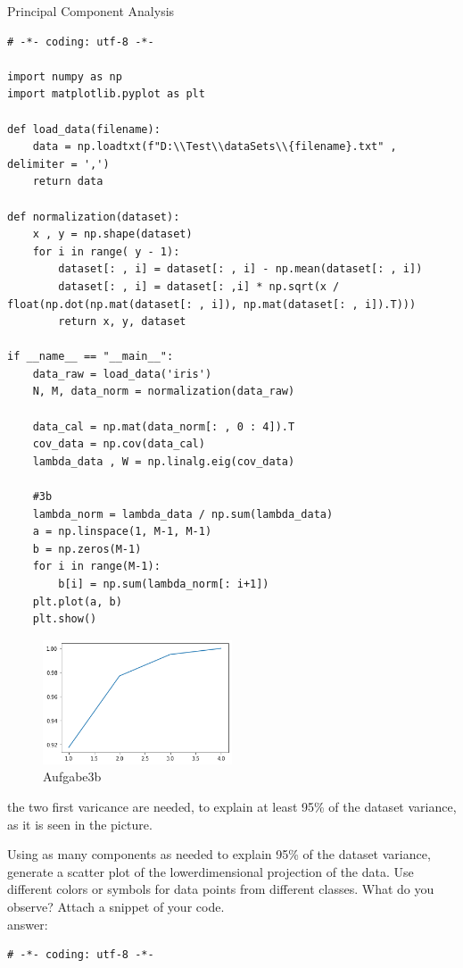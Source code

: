 \documentclass[
	ngerman,
     solution=true
	]{tudaexercise}
\begin{document}
\begin{task}{Principal Component Analysis}
\begin{subtask}[3b)]
\begin{lstlisting}
# -*- coding: utf-8 -*-

import numpy as np
import matplotlib.pyplot as plt

def load_data(filename):
    data = np.loadtxt(f"D:\\Test\\dataSets\\{filename}.txt" , delimiter = ',')
    return data

def normalization(dataset):
    x , y = np.shape(dataset)
    for i in range( y - 1):
        dataset[: , i] = dataset[: , i] - np.mean(dataset[: , i])
        dataset[: , i] = dataset[: ,i] * np.sqrt(x / float(np.dot(np.mat(dataset[: , i]), np.mat(dataset[: , i]).T)))
        return x, y, dataset
    
if __name__ == "__main__":
    data_raw = load_data('iris')
    N, M, data_norm = normalization(data_raw)
    
    data_cal = np.mat(data_norm[: , 0 : 4]).T
    cov_data = np.cov(data_cal)
    lambda_data , W = np.linalg.eig(cov_data)
    
    #3b
    lambda_norm = lambda_data / np.sum(lambda_data)
    a = np.linspace(1, M-1, M-1)
    b = np.zeros(M-1)
    for i in range(M-1):
        b[i] = np.sum(lambda_norm[: i+1])
    plt.plot(a, b)
    plt.show()
\end{lstlisting}
\begin{figure}[H] 
\centering 
\includegraphics[width=0.5\textwidth]{Aufgabe3_b.png} 
\caption{Aufgabe3b} 
\label{Fig.main3}
\end{figure}
the two first varicance are needed, to explain at least 95\% of the dataset variance, as it is seen in the picture.
\end{subtask}
\begin{subtask}[3c)]
Using as many components as needed to explain 95\% of the dataset variance, generate a scatter plot of the lowerdimensional
projection of the data. Use different colors or symbols for data points from different classes. What do you
observe? Attach a snippet of your code.\\[15pt]
answer:\\[15pt]
\begin{lstlisting}
# -*- coding: utf-8 -*-


\end{lstlisting}
\end{subtask}
\end{task}
\end{document}
